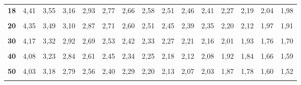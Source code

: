 \documentclass[
  11pt,
  ngerman,
  a4paper,
]{report}
\begin{document}
\begin{table}[H]
{\begin{tabular}{>{}r|rrrrrrrrrrrrrr}
\textbf{18} & 4,41 & 3,55 & 3,16 & 2,93 & 2,77 & 2,66 & 2,58 & 2,51 & 2,46 & 2,41 & 2,27 & 2,19 & 2,04 & 1,98\\
\textbf{\cellcolor{gray!6}{19}} & \cellcolor{gray!6}{4,38} & \cellcolor{gray!6}{3,52} & \cellcolor{gray!6}{3,13} & \cellcolor{gray!6}{2,90} & \cellcolor{gray!6}{2,74} & \cellcolor{gray!6}{2,63} & \cellcolor{gray!6}{2,54} & \cellcolor{gray!6}{2,48} & \cellcolor{gray!6}{2,42} & \cellcolor{gray!6}{2,38} & \cellcolor{gray!6}{2,23} & \cellcolor{gray!6}{2,16} & \cellcolor{gray!6}{2,00} & \cellcolor{gray!6}{1,94}\\
\textbf{20} & 4,35 & 3,49 & 3,10 & 2,87 & 2,71 & 2,60 & 2,51 & 2,45 & 2,39 & 2,35 & 2,20 & 2,12 & 1,97 & 1,91\\
\addlinespace
\textbf{\cellcolor{gray!6}{25}} & \cellcolor{gray!6}{4,24} & \cellcolor{gray!6}{3,39} & \cellcolor{gray!6}{2,99} & \cellcolor{gray!6}{2,76} & \cellcolor{gray!6}{2,60} & \cellcolor{gray!6}{2,49} & \cellcolor{gray!6}{2,40} & \cellcolor{gray!6}{2,34} & \cellcolor{gray!6}{2,28} & \cellcolor{gray!6}{2,24} & \cellcolor{gray!6}{2,09} & \cellcolor{gray!6}{2,01} & \cellcolor{gray!6}{1,84} & \cellcolor{gray!6}{1,78}\\
\textbf{30} & 4,17 & 3,32 & 2,92 & 2,69 & 2,53 & 2,42 & 2,33 & 2,27 & 2,21 & 2,16 & 2,01 & 1,93 & 1,76 & 1,70\\
\textbf{\cellcolor{gray!6}{35}} & \cellcolor{gray!6}{4,12} & \cellcolor{gray!6}{3,27} & \cellcolor{gray!6}{2,87} & \cellcolor{gray!6}{2,64} & \cellcolor{gray!6}{2,49} & \cellcolor{gray!6}{2,37} & \cellcolor{gray!6}{2,29} & \cellcolor{gray!6}{2,22} & \cellcolor{gray!6}{2,16} & \cellcolor{gray!6}{2,11} & \cellcolor{gray!6}{1,96} & \cellcolor{gray!6}{1,88} & \cellcolor{gray!6}{1,70} & \cellcolor{gray!6}{1,63}\\
\textbf{40} & 4,08 & 3,23 & 2,84 & 2,61 & 2,45 & 2,34 & 2,25 & 2,18 & 2,12 & 2,08 & 1,92 & 1,84 & 1,66 & 1,59\\
\textbf{\cellcolor{gray!6}{45}} & \cellcolor{gray!6}{4,06} & \cellcolor{gray!6}{3,20} & \cellcolor{gray!6}{2,81} & \cellcolor{gray!6}{2,58} & \cellcolor{gray!6}{2,42} & \cellcolor{gray!6}{2,31} & \cellcolor{gray!6}{2,22} & \cellcolor{gray!6}{2,15} & \cellcolor{gray!6}{2,10} & \cellcolor{gray!6}{2,05} & \cellcolor{gray!6}{1,89} & \cellcolor{gray!6}{1,81} & \cellcolor{gray!6}{1,63} & \cellcolor{gray!6}{1,55}\\
\addlinespace
\textbf{50} & 4,03 & 3,18 & 2,79 & 2,56 & 2,40 & 2,29 & 2,20 & 2,13 & 2,07 & 2,03 & 1,87 & 1,78 & 1,60 & 1,52\\
\textbf{\cellcolor{gray!6}{60}} & \cellcolor{gray!6}{4,00} & \cellcolor{gray!6}{3,15} & \cellcolor{gray!6}{2,76} & \cellcolor{gray!6}{2,53} & \cellcolor{gray!6}{2,37} & \cellcolor{gray!6}{2,25} & \cellcolor{gray!6}{2,17} & \cellcolor{gray!6}{2,10} & \cellcolor{gray!6}{2,04} & \cellcolor{gray!6}{1,99} & \cellcolor{gray!6}{1,84} & \cellcolor{gray!6}{1,75} & \cellcolor{gray!6}{1,56} & \cellcolor{gray!6}{1,48}\\

\end{tabular}}
\end{table}
\end{document}
